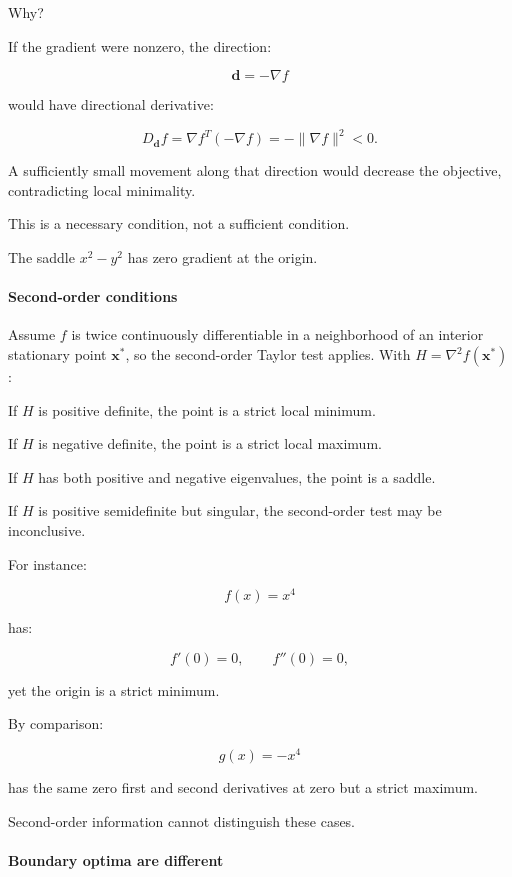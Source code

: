 Why?

If the gradient were nonzero, the direction:

\[
\mathbf d=-\nabla f
\]

would have directional derivative:

\[
D_{\mathbf d}f = \nabla f^T(-\nabla f) = -\|\nabla f\|^2<0.
\]

A sufficiently small movement along that direction would decrease the objective, contradicting local minimality.

This is a necessary condition, not a sufficient condition.

The saddle \(x^2-y^2\) has zero gradient at the origin.

\paragraph{Second-order conditions}\label{02-foundations-ii-ch026-second-order-conditions}

\hypertarget{02-foundations-ii-ch026-second-order-conditions}{}

Assume \(f\) is twice continuously differentiable in a neighborhood of an interior stationary point \(\mathbf x^*\), so the second-order Taylor test applies. With \(H=\nabla^2 f(\mathbf x^*)\):

If \(H\) is positive definite, the point is a strict local minimum.

If \(H\) is negative definite, the point is a strict local maximum.

If \(H\) has both positive and negative eigenvalues, the point is a saddle.

If \(H\) is positive semidefinite but singular, the second-order test may be inconclusive.

For instance:

\[
f(x)=x^4
\]

has:

\[
f'(0)=0,\qquad f''(0)=0,
\]

yet the origin is a strict minimum.

By comparison:

\[
g(x)=-x^4
\]

has the same zero first and second derivatives at zero but a strict maximum.

Second-order information cannot distinguish these cases.

\paragraph{Boundary optima are different}\label{02-foundations-ii-ch026-boundary-optima-are-different}

